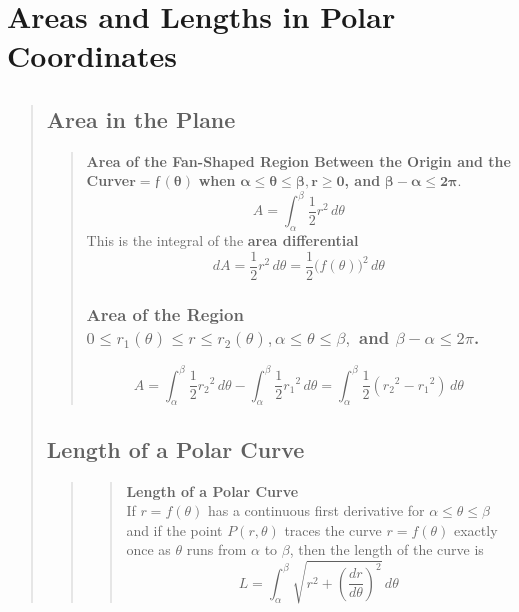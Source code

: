 \documentclass{report}
\begin{document}
\section{Areas and Lengths in Polar Coordinates  }
\begin{quote}

	\subsection{Area in the Plane}
	\begin{quote}

		\textbf{Area of the Fan-Shaped Region Between the Origin and the Curve}$\mathbf{r = ƒ(\theta)}$ \textbf{when} $\mathbf{\alpha\leq\theta\leq\beta, r \geq 0}$\textbf{, and} $\mathbf{\beta-\alpha\leq 2\pi}$.
		$$A = \int_{\alpha}^{\beta}\frac{1}{2}r^2 \,d\theta$$
		This is the integral of the \textbf{area differential}
		$$dA = \frac{1}{2}r^2\, d\theta = \frac{1}{2}\Big ( f\left (\theta \right )\Big )^2\, d\theta$$


		\subsubsection{Area of the Region $0\leq r_1(\theta)\leq r\leq r_2(\theta),\alpha\leq\theta\leq\beta,$ and $\beta - \alpha \leq 2\pi$.}
		$$A = \int_{\alpha}^{\beta}\frac{1}{2}{r_2}^2\,d\theta - \int_{\alpha}^{\beta}\frac{1}{2}{r_1}^2 \,d\theta = \int_{\alpha}^{\beta}\frac{1}{2}({r_2}^2-{r_1}^2)\, d\theta$$
	\end{quote}

	\subsection{Length of a Polar Curve}
	\begin{quote}

		\begin{quote}
		\textbf{Length of a Polar Curve}\\
		If $r = f(\theta)$ has a continuous first derivative for $\alpha\leq\theta\leq\beta$and if the point $P(r,\theta)$ traces the curve $r = f(\theta)$ exactly once as $\theta$ runs from $\alpha$ to $\beta$, then the length of the curve is
		$$L = \int_{\alpha}^{\beta}\sqrt{r^2 + \left (\frac{dr}{d\theta}\right )^2}\, d\theta$$
		\end{quote}


	\end{quote}

\end{quote}
\end{document}
